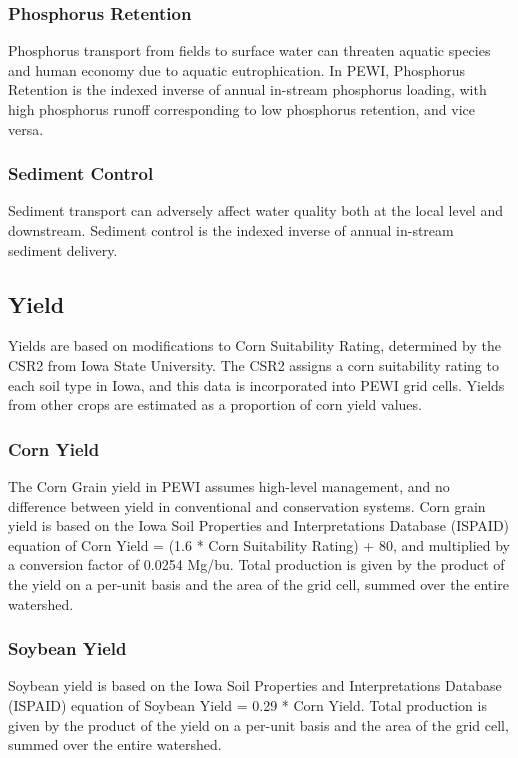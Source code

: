 \documentclass[11pt]{article}
\begin{document}
\subsubsection{Phosphorus Retention}
Phosphorus transport from fields to surface water can threaten aquatic species and human economy due to aquatic eutrophication. In PEWI, Phosphorus Retention is the indexed inverse of annual in-stream phosphorus loading, with high phosphorus runoff corresponding to low phosphorus retention, and vice versa.

\subsubsection{Sediment Control}
Sediment transport can adversely affect water quality both at the local level and downstream. Sediment control is the indexed inverse of annual in-stream sediment delivery. 

\subsection{Yield}
Yields are based on modifications to Corn Suitability Rating, determined by the CSR2 from Iowa State University. The CSR2 assigns a corn suitability rating to each soil type in Iowa, and this data is incorporated into PEWI grid cells. Yields from other crops are estimated as a proportion of corn yield values. 

\subsubsection{Corn Yield}
The Corn Grain yield in PEWI assumes high-level management, and no difference between yield in conventional and conservation systems. Corn grain yield is based on the Iowa Soil Properties and Interpretations Database (ISPAID) equation of Corn Yield = (1.6 * Corn Suitability Rating) + 80, and multiplied by a conversion factor of 0.0254 Mg/bu.\cite{42}  
 Total production is given by the product of the yield on a per-unit basis and the area of the grid cell, summed over the entire watershed. 
 
\subsubsection{Soybean Yield}
Soybean yield is based on the Iowa Soil Properties and Interpretations Database (ISPAID) equation of Soybean Yield = 0.29 * Corn Yield. Total production is given by the product of the yield on a per-unit basis and the area of the grid cell, summed over the entire watershed. 
\end{document}
